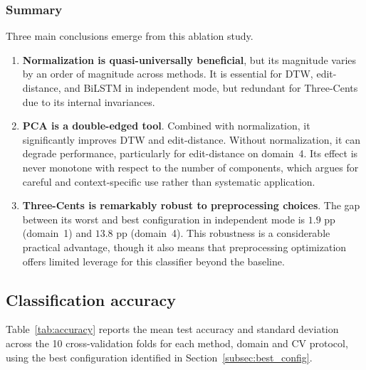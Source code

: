 \subsubsection{Summary}

Three main conclusions emerge from this ablation study.

\begin{enumerate}
  \item \textbf{Normalization is quasi-universally beneficial}, but its magnitude
    varies by an order of magnitude across methods. It is essential for DTW,
    edit-distance, and BiLSTM in independent mode, but redundant for Three-Cents
    due to its internal invariances.

  \item \textbf{PCA is a double-edged tool}. Combined with normalization, it
    significantly improves DTW and edit-distance. Without normalization, it can
    degrade performance, particularly for edit-distance on domain~4. Its effect is
    never monotone with respect to the number of components, which argues for careful
    and context-specific use rather than systematic application.

  \item \textbf{Three-Cents is remarkably robust to preprocessing choices}. The gap
    between its worst and best configuration in independent mode is $1.9$ pp
    (domain~1) and $13.8$ pp (domain~4). This robustness is a considerable practical
    advantage, though it also means that preprocessing optimization offers limited
    leverage for this classifier beyond the baseline.

\end{enumerate}


\subsection{Classification accuracy}
\label{subsec:accuracy}

 
Table~\ref{tab:accuracy} reports the mean test accuracy and standard deviation
across the 10 cross-validation folds for each method, domain and CV protocol,
using the best configuration identified in Section~\ref{subsec:best_config}.
 
